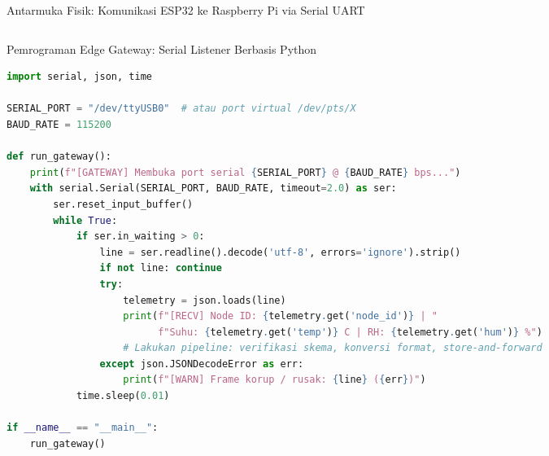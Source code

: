 \documentclass[aspectratio=169,10pt]{beamer}
\begin{document}
\begin{frame}{Antarmuka Fisik: Komunikasi ESP32 ke Raspberry Pi via Serial UART}
\begin{columns}[T]
\begin{column}{0.50\textwidth}
            \begin{center}
            \end{center}
        \end{column}
    \end{columns}
\end{frame}

\begin{frame}[fragile]{Pemrograman Edge Gateway: Serial Listener Berbasis Python}
    \begin{lstlisting}[style=slidecode, language=Python]
import serial, json, time

SERIAL_PORT = "/dev/ttyUSB0"  # atau port virtual /dev/pts/X
BAUD_RATE = 115200

def run_gateway():
    print(f"[GATEWAY] Membuka port serial {SERIAL_PORT} @ {BAUD_RATE} bps...")
    with serial.Serial(SERIAL_PORT, BAUD_RATE, timeout=2.0) as ser:
        ser.reset_input_buffer()
        while True:
            if ser.in_waiting > 0:
                line = ser.readline().decode('utf-8', errors='ignore').strip()
                if not line: continue
                try:
                    telemetry = json.loads(line)
                    print(f"[RECV] Node ID: {telemetry.get('node_id')} | "
                          f"Suhu: {telemetry.get('temp')} C | RH: {telemetry.get('hum')} %")
                    # Lakukan pipeline: verifikasi skema, konversi format, store-and-forward
                except json.JSONDecodeError as err:
                    print(f"[WARN] Frame korup / rusak: {line} ({err})")
            time.sleep(0.01)

if __name__ == "__main__":
    run_gateway()
    \end{lstlisting}
\end{frame}
\end{document}
